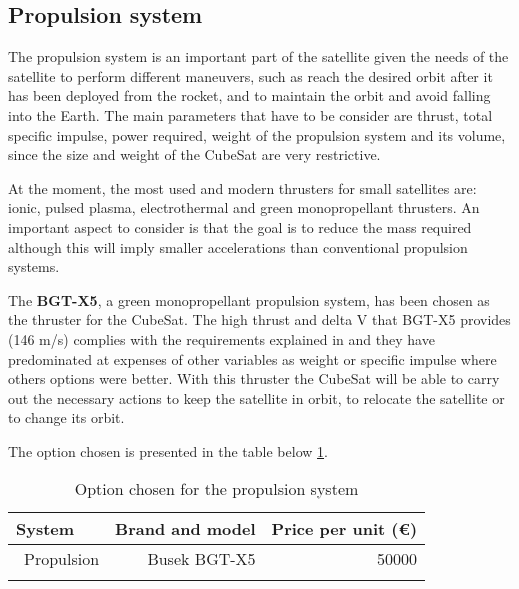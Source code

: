 \subsection{Propulsion system}
\label{ch:PropulsionSystems}
The propulsion system is an important part of the satellite given the needs of the satellite to perform different maneuvers, such as reach the desired orbit after it has been deployed from the rocket, and to maintain the orbit and avoid falling into the Earth. The main parameters that have to be consider are thrust, total specific impulse, power required, weight of the propulsion system and its volume, since the size and weight of the CubeSat are very restrictive. \cite[Chapter 1, Section 3]{annex4}

At the moment, the most used and modern thrusters for small satellites are: ionic, pulsed plasma, electrothermal and green monopropellant thrusters. An important aspect to consider is that the goal is to reduce the mass required although this will imply smaller accelerations than conventional propulsion systems.

The \textbf{BGT-X5}, a green monopropellant propulsion system, has been chosen as the thruster for the CubeSat. The high thrust and delta V that BGT-X5 provides (146 m/s) complies with the requirements explained in \cite[Chapter 1, Section 4]{annex2} and they have predominated at expenses of other variables as weight or specific impulse where others options were better. With this thruster the CubeSat will be able to carry out the necessary actions to keep the satellite in orbit, to relocate the satellite or to change its orbit. \cite[Chapter 1, Section 3]{annex4}

The option chosen is presented in the table below \ref{propulsionfinal}.

\begin{longtable}{| l | r | r | }
\hline
\rowcolor[gray]{0.80}	\textbf{System} &  \textbf{Brand and model}     & \textbf{Price per unit (\euro)}   \\
\hline
\endfirsthead

	   ~Propulsion & Busek BGT-X5 & 50000 \\
	\hline

\caption{Option chosen for the propulsion system}
\label{propulsionfinal}
\end{longtable}